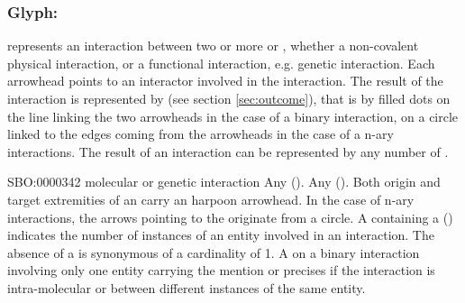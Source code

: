 
\subsubsection{Glyph: }\label{sec:interaction}

 represents an interaction between two or more  or , whether a non-covalent physical interaction, or a functional interaction, e.g. genetic interaction. Each arrowhead points to an interactor involved in the interaction. The result of the interaction is represented by  (see section \ref{sec:outcome}), that is by filled dots on the line linking the two arrowheads in the case of a binary interaction, on a circle linked to the edges coming from the arrowheads in the case of a  n-ary interactions. The result of an interaction can be represented by any number of .

\begin{glyphDescription}
 \glyphSboTerm SBO:0000342 molecular or genetic interaction
 \glyphOrigin Any  ().
 \glyphTarget Any  ().
 \glyphEndPoint Both origin and target extremities of an  carry an harpoon arrowhead. In the case of n-ary interactions, the arrows pointing to the  originate from a circle. 
\glyphAux A  containing a  () indicates the number of instances of an entity involved in an interaction. The absence of a  is synonymous of a cardinality of 1. A  on a binary interaction involving only one entity carrying the mention  or  precises if the interaction is intra-molecular or between different instances of the same entity.
 \end{glyphDescription}

